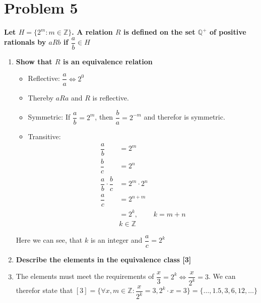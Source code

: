 \documentclass[english,11pt,a4paper]{article}
\begin{document}
\section*{Problem 5}
\textbf{Let $H=\{ 2^m : m \in \mathbb{Z}\}$. A relation $R$ is defined on the set $\mathbb{Q}^+$ of positive rationals by $aRb$ if $\dfrac{a}{b} \in H$}
\begin{enumerate}[a]
\item \textbf{Show that $R$ is an equivalence relation}
\begin{itemize}
\item Reflective: $\dfrac{a}{a} \Leftrightarrow 2^0$
\item[] Thereby $aRa$ and $R$ is reflective.

\item Symmetric: If $\dfrac{a}{b} =2^m$, then $\dfrac{b}{a}= 2^{-m}$ and therefor is symmetric.

\item Transitive: 
\begin{align}
\dfrac{a}{b} &= 2^m \\
\dfrac{b}{c} &= 2^n \\
\dfrac{a}{b} \cdot \dfrac{b}{c} &= 2^m \cdot 2^n \\ \dfrac{a}{c} &= 2^{n + m} \\
	&= 2^k, &k=m + n \\
	 &k \in \mathbb{Z}
\end{align} 
\end{itemize}
Here we can see, that $k$ is an integer and $\dfrac{a}{c} = 2^k$

\item \textbf{Describe the elements in the equivalence class [3]}
\item[] The elements must meet the requirements of  $\dfrac{x}{3} = 2^k \Leftrightarrow \dfrac{x}{2^k}=3$.
We can therefor state that $[3] = \{\forall x,m \in \mathbb{Z} : \dfrac{x}{2^k} = 3, 2^k\cdot x = 3\} = \{ \ldots, 1.5, 3,6,12, \ldots\}$
\end{enumerate}


\newpage
\end{document}
